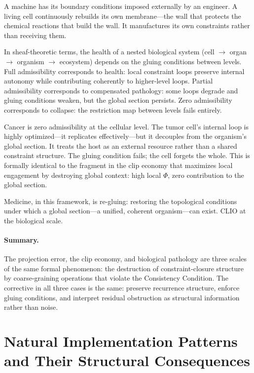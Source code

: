 \documentclass[12pt,a4paper]{article}
\begin{document}
A machine has its boundary conditions imposed externally by an engineer. A living cell continuously rebuilds its own membrane---the wall that protects the chemical reactions that build the wall. It manufactures its own constraints rather than receiving them.

In sheaf-theoretic terms, the health of a nested biological system (cell $\to$ organ $\to$ organism $\to$ ecosystem) depends on the gluing conditions between levels. Full admissibility corresponds to health: local constraint loops preserve internal autonomy while contributing coherently to higher-level loops. Partial admissibility corresponds to compensated pathology: some loops degrade and gluing conditions weaken, but the global section persists. Zero admissibility corresponds to collapse: the restriction map between levels fails entirely.

Cancer is zero admissibility at the cellular level. The tumor cell's internal loop is highly optimized---it replicates effectively---but it decouples from the organism's global section. It treats the host as an external resource rather than a shared constraint structure. The gluing condition fails; the cell forgets the whole. This is formally identical to the fragment in the clip economy that maximizes local engagement by destroying global context: high local $\Phi$, zero contribution to the global section.

Medicine, in this framework, is re-gluing: restoring the topological conditions under which a global section---a unified, coherent organism---can exist. CLIO at the biological scale.

\paragraph{Summary.}
The projection error, the clip economy, and biological pathology are three scales of the same formal phenomenon: the destruction of constraint-closure structure by coarse-graining operations that violate the Consistency Condition. The corrective in all three cases is the same: preserve recurrence structure, enforce gluing conditions, and interpret residual obstruction as structural information rather than noise.

\section{Natural Implementation Patterns and Their Structural Consequences}
\label{sec:pitfalls}
\end{document}
